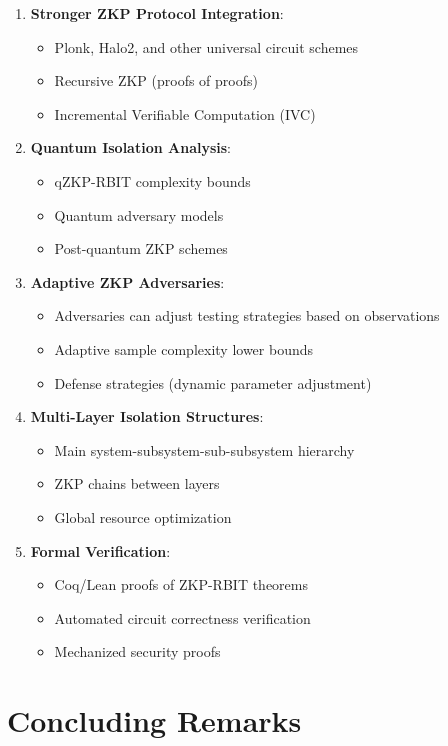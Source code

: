 \documentclass[12pt]{article}
\theoremstyle{plain}
\theoremstyle{definition}
\begin{document}
\begin{enumerate}
\item \textbf{Stronger ZKP Protocol Integration}:
\begin{itemize}
   \item Plonk, Halo2, and other universal circuit schemes
   \item Recursive ZKP (proofs of proofs)
   \item Incremental Verifiable Computation (IVC)
\end{itemize}

\item \textbf{Quantum Isolation Analysis}:
\begin{itemize}
   \item qZKP-RBIT complexity bounds
   \item Quantum adversary models
   \item Post-quantum ZKP schemes
\end{itemize}

\item \textbf{Adaptive ZKP Adversaries}:
\begin{itemize}
   \item Adversaries can adjust testing strategies based on observations
   \item Adaptive sample complexity lower bounds
   \item Defense strategies (dynamic parameter adjustment)
\end{itemize}

\item \textbf{Multi-Layer Isolation Structures}:
\begin{itemize}
   \item Main system-subsystem-sub-subsystem hierarchy
   \item ZKP chains between layers
   \item Global resource optimization
\end{itemize}

\item \textbf{Formal Verification}:
\begin{itemize}
   \item Coq/Lean proofs of ZKP-RBIT theorems
   \item Automated circuit correctness verification
   \item Mechanized security proofs
\end{itemize}
\end{enumerate}

\section*{Concluding Remarks}
\end{document}
